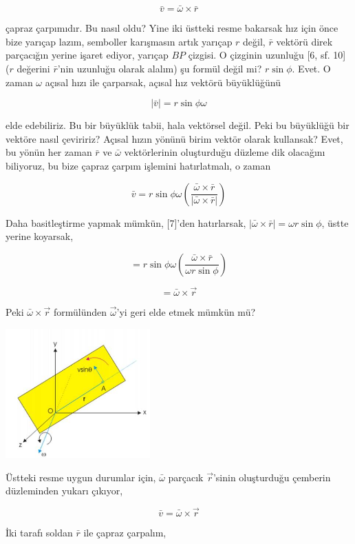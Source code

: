 \documentclass[12pt,fleqn]{article}\usepackage{../../common}
\begin{document}
$$
\bar{v} = \bar{\omega} \times \bar{r}
$$

çapraz çarpımıdır. Bu nasıl oldu? Yine iki üstteki resme bakarsak hız için önce
bize yarıçap lazım, semboller karışmasın artık yarıçap $r$ değil, $\bar{r}$
vektörü direk parçacığın yerine işaret ediyor, yarıçap $BP$ çizgisi. O çizginin
uzunluğu [6, sf. 10] ($r$ değerini $\bar{r}$'nin uzunluğu olarak alalım) şu
formül değil mi? $r\sin\phi$. Evet. O zaman $\omega$ açısal hızı ile çarparsak,
açısal hız vektörü büyüklüğünü

$$
|\bar{v}| = r \sin\phi \omega
$$

elde edebiliriz. Bu bir büyüklük tabii, hala vektörsel değil. Peki bu büyüklüğü
bir vektöre nasıl çeviririz?  Açısal hızın yönünü birim vektör olarak kullansak?
Evet, bu yönün her zaman $\bar{r}$ ve $\bar{\omega}$ vektörlerinin oluşturduğu
düzleme dik olacağını biliyoruz, bu bize çapraz çarpım işlemini hatırlatmalı, o
zaman

$$
\bar{v} = r \sin\phi \omega
\left( \frac{\bar{\omega} \times \bar{r}}{| \bar{\omega} \times \bar{r} |}  \right)
$$

Daha basitleştirme yapmak mümkün, [7]'den hatırlarsak,
$|\bar{\omega} \times \bar{r} | = \omega r \sin\phi$, üstte yerine koyarsak,

$$
 = r \sin\phi \omega
\left( \frac{\bar{\omega} \times \bar{r}}{\omega r \sin\phi}  \right)
$$

$$
 = \bar{\omega} \times \vec{r}
$$

Peki $\bar{\omega} \times \vec{r}$ formülünden $\vec{\omega}$'yi geri elde etmek
mümkün mü?

\includegraphics[width=15em]{phy_005_basics_02_16.jpg}

Üstteki resme uygun durumlar için, $\bar{\omega}$ parçacık $\vec{r}$'sinin
oluşturduğu çemberin düzleminden yukarı çıkıyor,


$$ \bar{v} = \bar{\omega} \times \vec{r}
$$

İki tarafı soldan $\bar{r}$ ile çapraz çarpalım,
\end{document}
